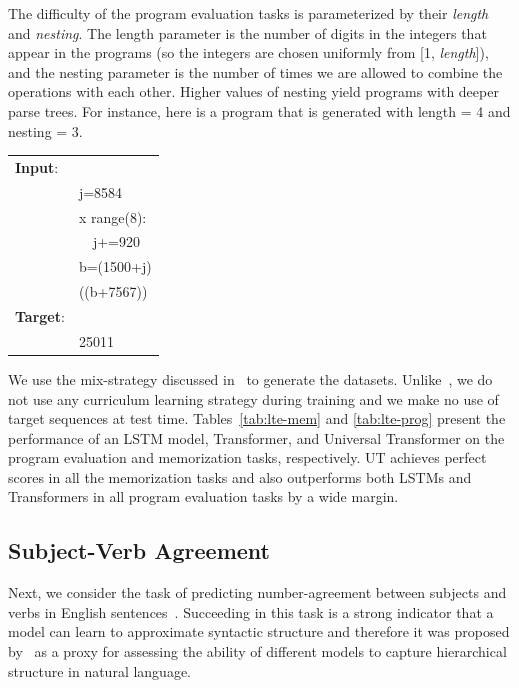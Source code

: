 The difficulty of the program evaluation tasks is parameterized by their \textit{length} and \textit{nesting}. The
length parameter is the number of digits in the integers that appear in the programs (so the integers are chosen uniformly from [1, \emph{length}]), and the nesting parameter is the number of times we are allowed to combine the operations with each
other. Higher values of nesting yield programs with deeper parse trees.
For instance, here is a program that is generated with length = 4 and
nesting = 3. 
\begin{table}[h!]
\fontsize{8}{8}\selectfont
\begin{tabular}{l l}
\textbf{Input}: & \\
& j=8584 \\
& {\color{blue}{for}} x {\color{blue}{in}} range(8): \\
& ~~j+=920 \\
& b=(1500+j) \\
& {\color{blue}{print}}((b+7567)) \\
\textbf{Target}: & \\
& 25011
\end{tabular}
\end{table}



We use the mix-strategy discussed in~\citep{ZS14} to generate the datasets. Unlike~\citep{ZS14}, we do not use any curriculum learning strategy during training and we make no use of target sequences at test time. Tables~\ref{tab:lte-mem} and \ref{tab:lte-prog} present the performance of an LSTM model, Transformer, and Universal Transformer on the program evaluation and memorization tasks, respectively. UT achieves perfect scores in all the memorization tasks and also outperforms both LSTMs and Transformers in all program evaluation tasks by a wide margin. 


\subsection{Subject-Verb Agreement}
Next, we consider the task of predicting number-agreement between subjects and verbs in English sentences~\citep{linzen2016assessing}. Succeeding in this task is a strong indicator that a model can learn to approximate syntactic structure and therefore it was proposed by~\citet{linzen2016assessing} as a proxy for assessing the ability of different models to capture hierarchical structure in natural language. 

